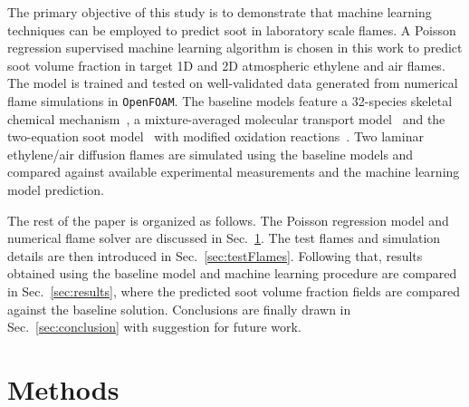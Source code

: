 \documentclass[12pt]{CHT-20}
\begin{document}
The primary objective of this study is to demonstrate that machine learning techniques can be employed to predict soot in laboratory scale flames. A Poisson regression supervised machine learning algorithm is chosen in this work to predict soot volume fraction in target 1D and 2D atmospheric ethylene and air flames. The model is trained and tested on well-validated data generated from numerical flame simulations in \texttt{OpenFOAM}. The baseline models feature a 32-species skeletal chemical mechanism~\citep[]{Lu_skeletalMech}, a mixture-averaged molecular transport model~\citep[]{Dasgupta2015} and the two-equation soot model~\citep[]{Leung_Lindstedt_Jones} with modified oxidation reactions~\citep[]{Guo2004}. Two laminar ethylene/air diffusion flames are simulated using the baseline models and compared against available experimental measurements and the machine learning model prediction.

The rest of the paper is organized as follows. The Poisson regression model and numerical flame solver are discussed in Sec.~\ref{sec:methods}. The test flames and simulation details are then introduced in Sec.~\ref{sec:testFlames}. Following that, results obtained using the baseline model and machine learning procedure are compared in Sec.~\ref{sec:results}, where the predicted soot volume fraction fields are compared against the baseline solution. Conclusions are finally drawn in Sec.~\ref{sec:conclusion} with suggestion for future work.









\section{Methods} \label{sec:methods}
\end{document}
